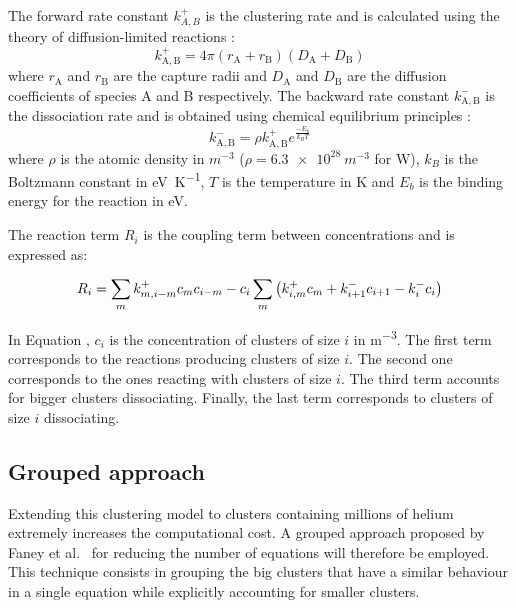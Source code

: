 The forward rate constant $k^+_{A,B}$ is the clustering rate and is calculated using the theory of diffusion-limited reactions :
\begin{equation}
    k^+_\mathrm{A,B} = 4 \pi (r_\mathrm{A} + r_\mathrm{B}) (D_\mathrm{A} + D_\mathrm{B})
\end{equation}
where $r_\mathrm{A}$ and $r_\mathrm{B}$ are the capture radii and $D_\mathrm{A}$ and $D_\mathrm{B}$ are the diffusion coefficients of species A and B respectively.
The backward rate constant $k^-_\mathrm{A,B}$ is the dissociation rate and is obtained using chemical equilibrium principles \cite{goldstein_diffusion_2007}:
\begin{equation}
    k^-_\mathrm{A,B} =\rho k^+_\mathrm{A,B}e^{\frac{-E_b}{k_B T}}
\end{equation}
where $\rho$ is the atomic density in $\si{m^{-3}}$ ($\rho = \SI{6.3e28}{m^{-3}}$ for W), $k_B$ is the Boltzmann constant in \si{eV.K^{-1}}, $T$ is the temperature in \si{K} and $E_b$ is the binding energy for the reaction  in \si{eV}.

The reaction term $R_i$ is the coupling term between concentrations and is expressed as:

\begin{equation}
    R_i=  \sum_{m} k^+_{m,i-m} c_m c_{i-m}  - c_i \sum_m \left( k_{i, m}^+ c_{m} + k_{i+1}^- c_{i+1} -  k_i^- c_i \right)
    \labeq{reaction term}
\end{equation}


In Equation , $c_i$ is the concentration of clusters of size $i$ in \si{m^{-3}}.
The first term corresponds to the reactions producing clusters of size $i$.
The second one corresponds to the ones reacting with clusters of size $i$.
The third term accounts for bigger clusters dissociating.
Finally, the last term corresponds to clusters of size $i$ dissociating.

\subsection{Grouped approach}
Extending this clustering model to clusters containing millions of helium extremely increases the computational cost.
A grouped approach proposed by Faney et al.\  for reducing the number of equations will therefore be employed.
This technique consists in grouping the big clusters that have a similar behaviour in a single equation while explicitly accounting for smaller clusters.


